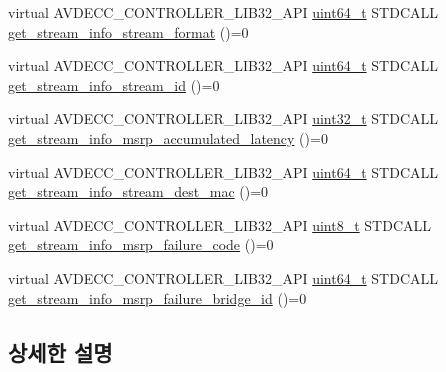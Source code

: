 \begin{DoxyCompactItemize}
\item 
virtual A\+V\+D\+E\+C\+C\+\_\+\+C\+O\+N\+T\+R\+O\+L\+L\+E\+R\+\_\+\+L\+I\+B32\+\_\+\+A\+PI \hyperlink{parse_8c_aec6fcb673ff035718c238c8c9d544c47}{uint64\+\_\+t} S\+T\+D\+C\+A\+LL \hyperlink{classavdecc__lib_1_1stream__input__get__stream__info__response_a44d4cdbe40182ecac3559f462a52fb6c}{get\+\_\+stream\+\_\+info\+\_\+stream\+\_\+format} ()=0
\item 
virtual A\+V\+D\+E\+C\+C\+\_\+\+C\+O\+N\+T\+R\+O\+L\+L\+E\+R\+\_\+\+L\+I\+B32\+\_\+\+A\+PI \hyperlink{parse_8c_aec6fcb673ff035718c238c8c9d544c47}{uint64\+\_\+t} S\+T\+D\+C\+A\+LL \hyperlink{classavdecc__lib_1_1stream__input__get__stream__info__response_a075bc859c84291de462603064f31dd06}{get\+\_\+stream\+\_\+info\+\_\+stream\+\_\+id} ()=0
\item 
virtual A\+V\+D\+E\+C\+C\+\_\+\+C\+O\+N\+T\+R\+O\+L\+L\+E\+R\+\_\+\+L\+I\+B32\+\_\+\+A\+PI \hyperlink{parse_8c_a6eb1e68cc391dd753bc8ce896dbb8315}{uint32\+\_\+t} S\+T\+D\+C\+A\+LL \hyperlink{classavdecc__lib_1_1stream__input__get__stream__info__response_ae4d4e7b9a2c69eb93fc7e277cc14a968}{get\+\_\+stream\+\_\+info\+\_\+msrp\+\_\+accumulated\+\_\+latency} ()=0
\item 
virtual A\+V\+D\+E\+C\+C\+\_\+\+C\+O\+N\+T\+R\+O\+L\+L\+E\+R\+\_\+\+L\+I\+B32\+\_\+\+A\+PI \hyperlink{parse_8c_aec6fcb673ff035718c238c8c9d544c47}{uint64\+\_\+t} S\+T\+D\+C\+A\+LL \hyperlink{classavdecc__lib_1_1stream__input__get__stream__info__response_a81e48c219d69340880c1698e196d644e}{get\+\_\+stream\+\_\+info\+\_\+stream\+\_\+dest\+\_\+mac} ()=0
\item 
virtual A\+V\+D\+E\+C\+C\+\_\+\+C\+O\+N\+T\+R\+O\+L\+L\+E\+R\+\_\+\+L\+I\+B32\+\_\+\+A\+PI \hyperlink{stdint_8h_aba7bc1797add20fe3efdf37ced1182c5}{uint8\+\_\+t} S\+T\+D\+C\+A\+LL \hyperlink{classavdecc__lib_1_1stream__input__get__stream__info__response_ac6de72a4fceb3b08ac797689cd04c213}{get\+\_\+stream\+\_\+info\+\_\+msrp\+\_\+failure\+\_\+code} ()=0
\item 
virtual A\+V\+D\+E\+C\+C\+\_\+\+C\+O\+N\+T\+R\+O\+L\+L\+E\+R\+\_\+\+L\+I\+B32\+\_\+\+A\+PI \hyperlink{parse_8c_aec6fcb673ff035718c238c8c9d544c47}{uint64\+\_\+t} S\+T\+D\+C\+A\+LL \hyperlink{classavdecc__lib_1_1stream__input__get__stream__info__response_a8873569631d5d34b648931d4a669cbfe}{get\+\_\+stream\+\_\+info\+\_\+msrp\+\_\+failure\+\_\+bridge\+\_\+id} ()=0
\end{DoxyCompactItemize}


\subsection{상세한 설명}


